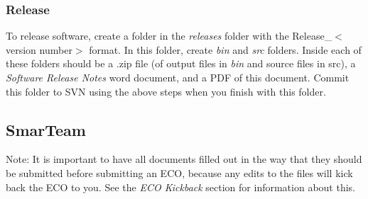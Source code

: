 \documentclass[10pt]{article}
\begin{document}
            \subsubsection{Release}
                To release software, create a folder in the \emph{releases} folder with the Release\_$<$version number$>$ format. In this folder, create \emph{bin} and \emph{src} folders. Inside each of these folders should be a .zip file (of output files in \emph{bin} and source files in {src}), a \emph{Software Release Notes} word document, and a PDF of this document. Commit this folder to SVN using the above steps when you finish with this folder.
        \subsection{SmarTeam}
            Note: It is important to have all documents filled out in the way that they should be submitted before submitting an ECO, because any edits to the files will kick back the ECO to you. See the \emph{ECO Kickback} section for information about this.
\end{document}
